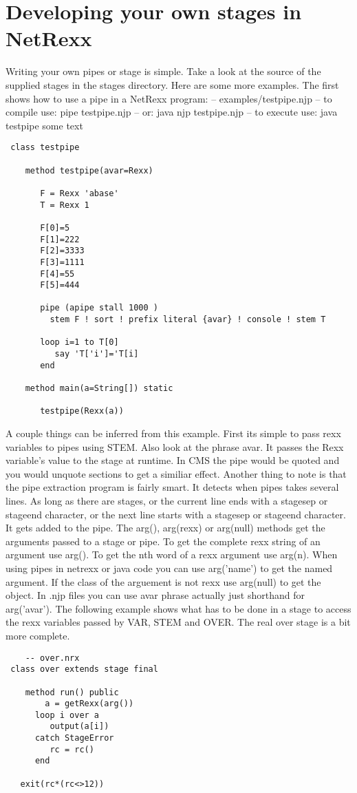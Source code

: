 \chapter{Developing your own stages in NetRexx}
Writing your own pipes or stage is simple.  Take a look at the source of the supplied stages in the stages directory.  Here are some more examples.  The first shows how to use a pipe in a NetRexx program:
    -- examples/testpipe.njp
    -- to compile use: pipe testpipe.njp
    --             or: java njp testpipe.njp
    -- to execute use: java testpipe some text
\begin{lstlisting}
 class testpipe

    method testpipe(avar=Rexx)

       F = Rexx 'abase'
       T = Rexx 1

       F[0]=5
       F[1]=222
       F[2]=3333
       F[3]=1111
       F[4]=55
       F[5]=444

       pipe (apipe stall 1000 )
         stem F ! sort ! prefix literal {avar} ! console ! stem T

       loop i=1 to T[0]
          say 'T['i']='T[i]
       end

    method main(a=String[]) static

       testpipe(Rexx(a))
\end{lstlisting}
 A couple things can be inferred from this example.  First its simple to pass rexx variables to pipes using STEM.  Also look at the  phrase {avar}. It passes the Rexx variable's value to the stage at runtime.  In CMS the pipe would be quoted and you would unquote sections to get a similiar effect.
Another thing to note is that the pipe extraction program is fairly smart. It detects when pipes takes several lines.  As long as there are stages, or the current line ends with a stagesep or stageend character, or the next line starts with a stagesep or stageend character.  It gets added to the pipe.
The arg(), arg(rexx) or arg(null) methods get the arguments passed to a stage or pipe.  To get the complete rexx string of an argument use arg(). To get the nth word of a rexx argument use arg(n).  When using pipes in netrexx or java code you can use arg('name') to get the named argument. If the class of the arguement is not rexx use arg(null) to get the object.
In .njp files you can use {avar} phrase actually just shorthand for  arg('avar').
The following example shows what has to be done in a stage to access the rexx variables passed by VAR, STEM and OVER.  The real  over stage is a bit more complete.
\begin{lstlisting}
    -- over.nrx
 class over extends stage final

    method run() public
        a = getRexx(arg())
      loop i over a
         output(a[i])
      catch StageError
         rc = rc()
      end
    
   exit(rc*(rc<>12))
\end{lstlisting}
